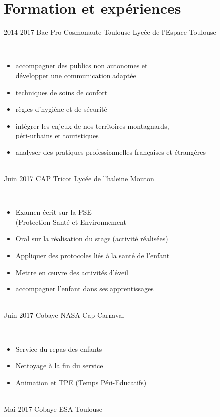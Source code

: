 \documentclass[]{cv-style}          %
\begin{document}
\section{Formation et expériences}
\begin{entrylist}
\entry
{2014-2017}
{Bac Pro Cosmonaute Toulouse}
{Lycée de l'Espace Toulouse}
{\\
	\begin{itemize}
		\item accompagner des publics non autonomes et \\développer une communication adaptée
		\item techniques de soins de confort
		\item règles d'hygiène et de sécurité
		\item intégrer les enjeux de nos territoires montagnards, \\péri-urbains et touristiques
		\item analyser des pratiques professionnelles françaises et étrangères
\end{itemize}}\\
\entry
{Juin 2017}
{CAP Tricot}
{Lycée de l'haleine Mouton}
{\\
	\begin{itemize}
		\item Examen écrit sur la PSE \\(Protection Santé et Environnement
		\item Oral sur la réalisation du stage (activité réalisées)
		\item Appliquer des protocoles liés à la santé de l’enfant
		\item Mettre en œuvre des activités d’éveil
		\item accompagner l’enfant dans ses apprentissages
\end{itemize}}\\
\entry
{Juin 2017}
{Cobaye}
{NASA Cap Carnaval}
{\\
	\begin{itemize}
		\item Service du repas des enfants
		\item Nettoyage à la fin du service
		\item Animation et TPE (Temps Péri-Educatifs)
	\end{itemize}}\\
\entry
{Mai 2017}
{Cobaye}
{ESA Toulouse}

\end{entrylist}
\end{document}
